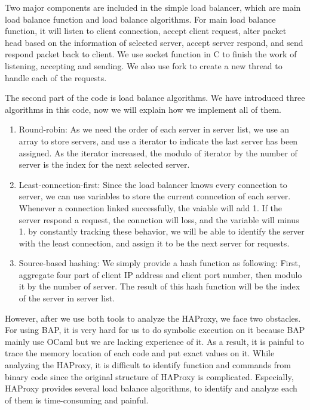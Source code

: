 


Two major components are included in the simple load balancer, which are main
load balance function and load balance algorithms.  For main load balance
function, it will \ca listen to client connection, \cb accept client request,
\cc alter packet head based on the information of selected server, \cd accept
server respond, and \ce send respond packet back to client.  We use socket
function in C to finish the work of listening, accepting and sending.  We also
use fork to create a new thread to handle each of the requests.

The second part of the code is load balance algorithms.  We have introduced
three algorithms in this code, now we will explain how we implement all of them.
\begin{enumerate}
    \item Round-robin: As we need the order of each server in server list, we
        use an array to store servers, and use a iterator to indicate the last
        server has been assigned. As the iterator increased, the modulo of
        iterator by the number of server is the index for the next selected
        server.
    \item Least-conncetion-first: Since the load balancer knows every conncetion
        to server, we can use variables to store the current conncetion of each
        server. Whenever a connection linked successfully, the vaiable will add
        1. If the server respond a request, the connction will loss, and the
        variable will minus 1. by constantly tracking these behavior, we will be
        able to identify the server with the least connection, and assign it to
        be the next server for requests.
    \item Source-based hashing: We simply provide a hash function as following:
        First, aggregate four part of client IP address and client port number,
        then modulo it by the number of server. The result of this hash function
        will be the index of the server in server list.
\end{enumerate}



However, after we use both tools to analyze the HAProxy, we face two obstacles.
\ci For using BAP, it is very hard for us to do symbolic execution on it because
BAP mainly use OCaml but we are lacking experience of it. As a result, it is
painful to trace the memory location of each code and put exact values on it.
\cii While analyzing the HAProxy, it is difficult to identify function and
commands from binary code since the original structure of HAProxy is
complicated.  Especially, HAProxy provides several load balance algorithms, to
identify and analyze each of them is time-consuming and painful.

